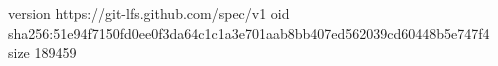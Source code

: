version https://git-lfs.github.com/spec/v1
oid sha256:51e94f7150fd0ee0f3da64c1c1a3e701aab8bb407ed562039cd60448b5e747f4
size 189459
